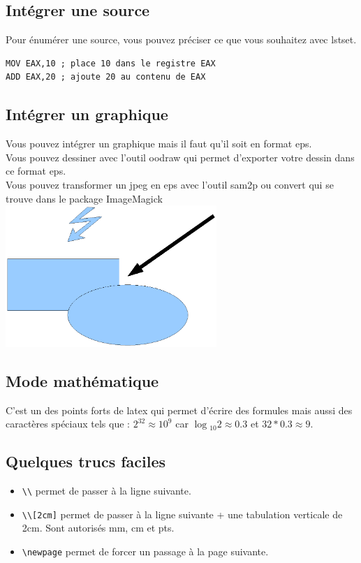 \subsection {Intégrer une source}
Pour énumérer une source, vous pouvez préciser ce que vous souhaitez avec lstset. 
\begin{lstlisting}
MOV EAX,10 ; place 10 dans le registre EAX
ADD EAX,20 ; ajoute 20 au contenu de EAX
\end{lstlisting}
\subsection {Intégrer un graphique}
Vous pouvez intégrer un graphique mais il faut qu'il soit en format eps.\\
Vous pouvez dessiner avec l'outil oodraw qui permet d'exporter votre dessin dans ce format eps.\\
Vous pouvez transformer un jpeg en eps avec l'outil sam2p ou convert qui se trouve dans le package ImageMagick\\
\includegraphics[width=8cm]{Dessin.eps}
\subsection {Mode mathématique}
C'est un des points forts de latex qui permet d'écrire des formules mais aussi des caractères spéciaux tels que :
$2^{32} \approx 10^{9}$ car $\log{_{10}}{2} \approx 0.3$ et $32*0.3 \approx 9$.
\subsection {Quelques trucs faciles}
\begin{itemize}
\item \verb+\\+ permet de passer à la ligne suivante.
\item \verb+\\[2cm]+ permet de passer à la ligne suivante + une tabulation verticale de 2cm. Sont autorisés mm, cm et pts.
\item \verb+\newpage+ permet de forcer un passage à la page suivante.
\end{itemize}

